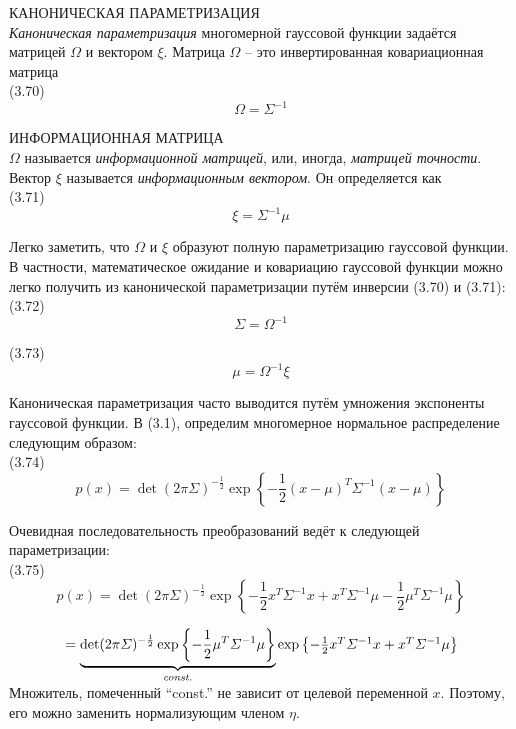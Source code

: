 \documentclass[10pt,a4paper]{article}
\begin{document}
КАНОНИЧЕСКАЯ ПАРАМЕТРИЗАЦИЯ\\
\textit{Каноническая параметризация} многомерной гауссовой функции задаётся матрицей $\varOmega$ и вектором $\xi$. Матрица $\varOmega$ – это инвертированная ковариационная матрица\\

(3.70)
$$\varOmega=\varSigma^{-1}$$

ИНФОРМАЦИОННАЯ МАТРИЦА\\
$\varOmega$ называется \textit{информационной матрицей}, или, иногда, \textit{матрицей точности}. Вектор $\xi$ называется \textit{информационным вектором}. Он определяется как\\

(3.71)
$$\xi=\varSigma^{-1}\mu$$

Легко заметить, что $\varOmega$ и $\xi$ образуют полную параметризацию гауссовой функции. В частности, математическое ожидание и ковариацию гауссовой функции можно легко получить из канонической параметризации путём инверсии (3.70) и (3.71):\\

(3.72)
$$\varSigma=\varOmega^{-1}$$

(3.73)
$$\mu=\varOmega^{-1}\xi$$

Каноническая параметризация часто выводится путём умножения экспоненты гауссовой функции. В (3.1), определим многомерное нормальное распределение следующим образом:\\

(3.74)
$$p(x)=\det(2\pi\varSigma)^{-\frac{1}{2}}\exp\left\lbrace -\frac{1}{2}(x-\mu)^T\varSigma^{-1}(x-\mu)\right\rbrace $$

Очевидная последовательность преобразований ведёт к следующей параметризации:\\

(3.75)
$$p(x)=\det(2\pi\varSigma)^{-\frac{1}{2}}\exp\left\lbrace -\frac{1}{2}x^T\varSigma^{-1}x+x^T\varSigma^{-1}\mu-\frac{1}{2}\mu^T\varSigma^{-1}\mu\right\rbrace$$

$\hspace{14mm}=\underbrace{\det(2\pi\varSigma)^{-\frac{1}{2}}\exp\left\lbrace-\frac{1}{2}\mu^T\varSigma^{-1}\mu\right\rbrace }_{\textit{const.}}\exp\left\lbrace -\frac{1}{2}x^T\varSigma^{-1}x+x^T\varSigma^{-1}\mu\right\rbrace$\\

Множитель, помеченный “const.” не зависит от целевой переменной $x$. Поэтому, его можно заменить нормализующим членом $\eta$.\\
\end{document}
